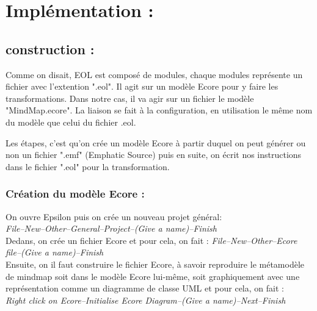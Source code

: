 \documentclass[french]{article}
\begin{document}
\newpage
	
\section{Implémentation :}
\subsection{construction :}
\hspace{10 mm} Comme on disait, EOL est composé de modules, chaque modules représente un fichier avec l'extention ".eol". Il agit sur un modèle Ecore pour y faire les transformations. Dans notre cas, il va agir sur un fichier le modèle "MindMap.ecore". La liaison se fait à la configuration, en utilisation le même nom du modèle que celui du fichier .eol. 
\par
Les étapes, c'est qu'on crée un modèle Ecore à partir duquel on peut générer ou non un fichier ".emf" (Emphatic Source) puis en suite, on écrit nos instructions dans le fichier ".eol" pour la transformation.

\subsubsection{Création du modèle Ecore :}
\hspace{10 mm} On ouvre Epsilon puis on crée un nouveau projet général:\linebreak \\ 

\hspace{13 mm} \textit{File--New--Other--General--Project--(Give a name)--Finish} \linebreak \\ 
Dedans, on crée un fichier Ecore et pour cela, on fait : \linebreak 
\hspace{13 mm} \textit{File--New--Other--Ecore file--(Give a name)--Finish} \linebreak \\
Ensuite, on il faut construire le fichier Ecore, à savoir reproduire le métamodèle de mindmap soit dans le modèle Ecore lui-même, soit graphiquement avec une représentation comme un diagramme de classe UML et pour cela, on fait : \linebreak \\ 
\textit{Right click on Ecore--Initialise Ecore Diagram--(Give a name)--Next--Finish} \linebreak \\
\end{document}
